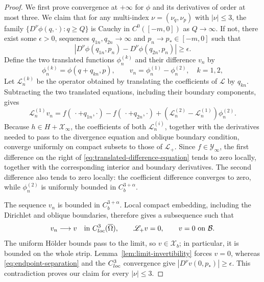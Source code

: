 \documentclass[10pt,a4paper]{amsart}
\theoremstyle{plain}
\begin{document}
	\begin{proof}
		{We first prove convergence at $+\infty$ for $\phi$ and its derivatives of order at most three.} We claim that for any multi-index $\nu=(\nu_q,\nu_p)$ with $|\nu|\leq3$, the family $\{D^\nu \phi(q,\cdot):q\geq Q\}$ is Cauchy in $C^0([-m,0])$ as $Q\to\infty$. If not, there exist some $\epsilon>0$, sequences $q_{1n},q_{2n}\to\infty$ and $p_n\to p_*\in[-m,0]$ such that
		\begin{equation}\label{eq:endpoint-separation}
		|D^\nu\phi(q_{1n},p_n)-D^\nu\phi(q_{2n},p_n)|\geq\epsilon.
		\end{equation}
		{Define the two translated functions $\phi_n^{(k)}$ and their difference $v_n$ by}
		\begin{equation*}
			\phi_n^{(k)}=\phi(q+q_{kn},p),\qquad v_n=\phi_n^{(1)}-\phi_n^{(2)},\quad k=1,2,
		\end{equation*}
		{Let $\mathscr L_n^{(k)}$ be the operator obtained by translating the coefficients of $\mathscr L$ by $q_{kn}$. Subtracting the two translated equations, including their boundary components, gives}
		\begin{equation}\label{eq:translated-difference-equation}
			{\mathscr L_n^{(1)}}v_n
			=f(\,\cdot+q_{1n},\cdot)-f(\,\cdot+q_{2n},\cdot)
			+({\mathscr L_n^{(2)}}-{\mathscr L_n^{(1)}})\phi_n^{(2)}.
		\end{equation}
		Because \(h\in H+\mathscr X_\infty\), the coefficients of both
		\({\mathscr L_n^{(i)}}\), together with the derivatives needed to pass to the
		divergence equation and oblique boundary condition, converge uniformly on
		compact subsets to those of \(\mathscr L_+\).  Since \(f\in\mathscr Y_\infty\), the
		first difference on the right of
		\eqref{eq:translated-difference-equation} tends to zero locally, together
		with the corresponding interior and boundary derivatives.  The second
		difference also tends to zero locally: the coefficient difference converges
		to zero, while \(\phi_n^{(2)}\) is uniformly bounded in
		\(C_b^{3+\alpha}\).
		
		The sequence \(v_n\) is bounded in \(C_b^{3+\alpha}\).  Local compact 	embedding, including the Dirichlet and oblique boundaries, therefore gives a	subsequence such that
		\begin{equation*}
			v_n\longrightarrow v\quad\hbox{in }C_{\rm loc}^{3}(\overline\Omega),
			\qquad {\mathscr L_+}v=0,\qquad v=0\ \hbox{on }\mathcal B .
		\end{equation*}
		The uniform H\"older bounds pass to the limit, so \(v\in\mathscr X_b\); in particular, it is bounded on the whole strip.  Lemma~\ref{lem:limit-invertibility}
		forces \(v=0\), whereas \eqref{eq:endpoint-separation} and the
		\(C^3_{\rm loc}\) convergence give \(|D^\nu v(0,p_*)|\ge\epsilon\).
		This contradiction proves our claim for every
		\(|\nu|\le3\).
		

\end{proof}
\end{document}
